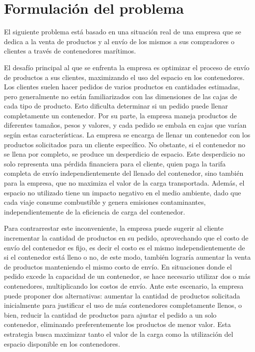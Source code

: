 \section{Formulación del problema}

El siguiente problema está basado en una situación real de una empresa que se dedica a la venta de productos y al envío de los mismos a sus compradores o clientes a través de contenedores marítimos.

El desafío principal al que se enfrenta la empresa es optimizar el proceso de envío de productos a sus clientes, maximizando el uso del espacio en los contenedores. Los clientes suelen hacer pedidos de varios productos en cantidades estimadas, pero generalmente no están familiarizados con las dimensiones de las cajas de cada tipo de producto. Esto dificulta determinar si un pedido puede llenar completamente un contenedor. Por su parte, la empresa maneja productos de diferentes tamaños, pesos y valores, y cada pedido se embala en cajas que varían según estas características. La empresa se encarga de llenar un contenedor con los productos solicitados para un cliente específico. No obstante, si el contenedor no se llena por completo, se produce un desperdicio de espacio. Este desperdicio no solo representa una pérdida financiera para el cliente, quien paga la tarifa completa de envío independientemente del llenado del contenedor, sino también para la empresa, que no maximiza el valor de la carga transportada. Además, el espacio no utilizado tiene un impacto negativo en el medio ambiente, dado que cada viaje consume combustible y genera emisiones contaminantes, independientemente de la eficiencia de carga del contenedor.

Para contrarrestar este inconveniente, la empresa puede sugerir al cliente incrementar la cantidad de productos en su pedido, aprovechando que el costo de envío del contenedor es fijo, es decir el costo es el mismo independientemente de si el contenedor está lleno o no, de este modo, también lograría aumentar la venta de productos manteniendo el mismo costo de envío. En situaciones donde el pedido excede la capacidad de un contenedor, se hace necesario utilizar dos o más contenedores, multiplicando los costos de envío. Ante este escenario, la empresa puede proponer dos alternativas: aumentar la cantidad de productos solicitada inicialmente para justificar el uso de más contenedores completamente llenos, o bien, reducir la cantidad de productos para ajustar el pedido a un solo contenedor, eliminando preferentemente los productos de menor valor. Esta estrategia busca maximizar tanto el valor de la carga como la utilización del espacio disponible en los contenedores.

